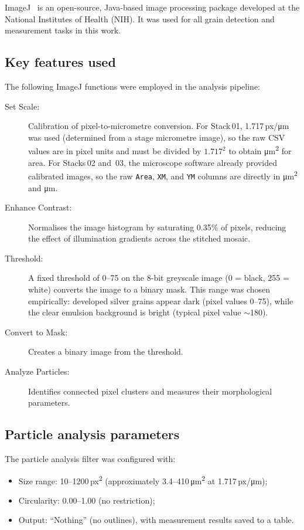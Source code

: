 \documentclass[12pt,a4paper]{article}
\begin{document}
ImageJ~\cite{imagej} is an open-source, Java-based image processing
package developed at the National Institutes of Health (NIH). It was
used for all grain detection and measurement tasks in this work.

\subsection{Key features used}

The following ImageJ functions were employed in the analysis pipeline:

\begin{description}
  \item[Set Scale:] Calibration of pixel-to-micrometre conversion.
        For Stack\,01, 1.717\,px/\si{\micro\meter} was used (determined from
        a stage micrometre image), so the raw CSV values are in pixel
        units and must be divided by $1.717^2$ to obtain
        \si{\micro\meter\squared} for area. For Stacks\,02 and~03, the
        microscope software already provided calibrated images, so the
        raw \texttt{Area}, \texttt{XM}, and \texttt{YM} columns are
        directly in \si{\micro\meter\squared} and \si{\micro\meter}.  
  \item[Enhance Contrast:] Normalises the image histogram by saturating
        0.35\% of pixels, reducing the effect of illumination gradients
        across the stitched mosaic.
  \item[Threshold:] A fixed threshold of 0--75 on the 8-bit greyscale
        image (0 = black, 255 = white) converts the image to a binary
        mask. This range was chosen empirically: developed silver
        grains appear dark (pixel values 0--75), while the clear
        emulsion background is bright (typical pixel value $\sim$180).
  \item[Convert to Mask:] Creates a binary image from the threshold.
  \item[Analyze Particles:] Identifies connected pixel clusters and
        measures their morphological parameters.
\end{description}

\subsection{Particle analysis parameters}

The particle analysis filter was configured with:
\begin{itemize}
  \item Size range: 10--1200\,px\textsuperscript{2}
        (approximately 3.4--410\,\si{\micro\meter\squared}
        at 1.717\,px/\si{\micro\meter});
  \item Circularity: 0.00--1.00 (no restriction);
  \item Output: ``Nothing'' (no outlines), with measurement results
        saved to a table.
\end{itemize}
\end{document}
